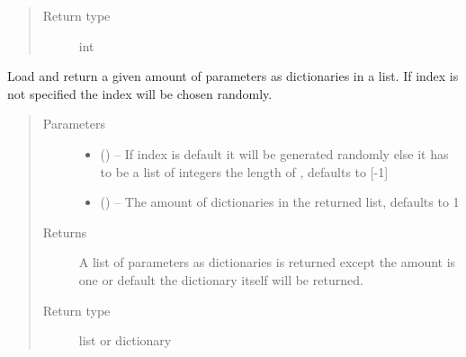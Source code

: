 \documentclass[letterpaper,10pt,english]{sphinxmanual}
\begin{document}
\begin{fulllineitems}
\begin{fulllineitems}
\begin{quote}
\begin{description}
\item[{Return type}] \leavevmode
int

\end{description}\end{quote}

\end{fulllineitems}


\begin{fulllineitems}
\label{\detokenize{index:dataset.dataset_cuboids.load_parameters}}
Load and return a given amount of parameters as dictionaries in a list. If index is not specified the index will be chosen randomly.
\begin{quote}\begin{description}
\item[{Parameters}] \leavevmode\begin{itemize}
\item {} 
 (\sphinxstyleliteralemphasis{\sphinxupquote{, }}) -- If index is default it will be generated randomly else it has to be a list of integers the length of , defaults to {[}-1{]}

\item {} 
 (\sphinxstyleliteralemphasis{\sphinxupquote{, }}) -- The amount of dictionaries in the returned list, defaults to 1

\end{itemize}

\item[{Returns}] \leavevmode
A list of parameters as dictionaries is returned except the amount is one or default the dictionary itself will be returned.

\item[{Return type}] \leavevmode
list or dictionary

\end{description}\end{quote}

\end{fulllineitems}


\end{fulllineitems}
\end{document}
